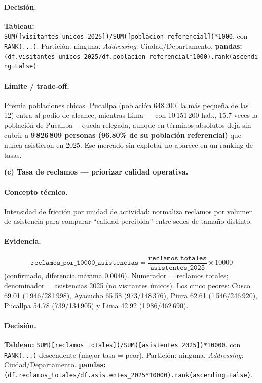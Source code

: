 \paragraph{Decisión.} \textbf{Tableau:} \lstinline{SUM([visitantes_unicos_2025])/SUM([poblacion_referencial])*1000}, con \lstinline{RANK(...)}. Partición: ninguna. \emph{Addressing}: Ciudad/Departamento. \textbf{pandas:} \lstinline{(df.visitantes_unicos_2025/df.poblacion_referencial*1000).rank(ascending=False)}.

\paragraph{Límite / trade-off.} Premia poblaciones chicas. Pucallpa (población 648\,200, la más pequeña de las 12) entra al podio de alcance, mientras Lima --- con 10\,151\,200 hab., 15.7 veces la población de Pucallpa--- queda relegada, aunque en términos absolutos deja sin cubrir a \textbf{9\,826\,809 personas (96.80\% de su población referencial)} que nunca asistieron en 2025. Ese mercado sin explotar no aparece en un ranking de tasas.

\textbf{(c) Tasa de reclamos --- priorizar calidad operativa.}

\paragraph{Concepto técnico.} Intensidad de fricción por unidad de actividad: normaliza reclamos por volumen de asistencia para comparar ``calidad percibida'' entre sedes de tamaño distinto.

\paragraph{Evidencia.}
\[
\texttt{reclamos\_por\_10000\_asistencias} = \frac{\texttt{reclamos\_totales}}{\texttt{asistentes\_2025}} \times 10000
\]
(confirmado, diferencia máxima 0.0046). Numerador = reclamos totales; denominador = asistencias 2025 (no visitantes únicos). Los cinco peores: Cusco 69.01 (1\,946/281\,998), Ayacucho 65.58 (973/148\,376), Piura 62.61 (1\,546/246\,920), Pucallpa 54.78 (739/134\,905) y Lima 42.92 (1\,986/462\,690).

\paragraph{Decisión.} \textbf{Tableau:} \lstinline{SUM([reclamos_totales])/SUM([asistentes_2025])*10000}, con \lstinline{RANK(...)} descendente (mayor tasa = peor). Partición: ninguna. \emph{Addressing}: Ciudad/Departamento. \textbf{pandas:} \lstinline{(df.reclamos_totales/df.asistentes_2025*10000).rank(ascending=False)}.

